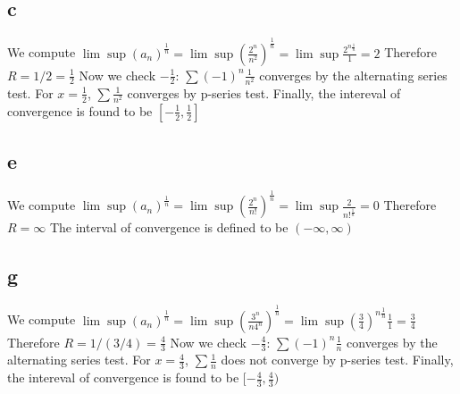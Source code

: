 \documentclass[12pt]{article}
\begin{document}
\subsection{c}
We compute $\lim \sup (a_n)^\frac{1}{n} = \lim \sup (\frac{2^n}{n^2})^\frac{1}{n} = \lim \sup \frac{2^{n\frac{1}{n}}}{1} = 2$
Therefore $R = 1/2 = \frac{1}{2}$
\newline
Now we check $-\frac{1}{2}$: $\sum (-1)^n\frac{1}{n^2}$ converges by the alternating series test.
\newline
For $x= \frac{1}{2}$, $\sum \frac{1}{n^2}$ converges by p-series test.
\newline
Finally, the intereval of convergence is found to be $[-\frac{1}{2},\frac{1}{2}]$

\subsection{e}
We compute $\lim \sup (a_n)^\frac{1}{n} = \lim \sup (\frac{2^n}{n!})^\frac{1}{n} = \lim \sup \frac{2}{n!^{\frac{1}{n}}} = 0$
Therefore $R = \infty$
\newline
The interval of convergence is defined to be $(-\infty, \infty)$

\subsection{g}
We compute $\lim \sup (a_n)^\frac{1}{n} = \lim \sup (\frac{3^n}{n4^n})^\frac{1}{n} = \lim \sup (\frac{3}{4})^{n\frac{1}{n}}\frac{1}{1} = \frac{3}{4}$
Therefore $R = 1/(3/4) = \frac{4}{3}$
\newline
Now we check $-\frac{4}{3}$: $\sum (-1)^n\frac{1}{n}$ converges by the alternating series test.
\newline
For $x= \frac{4}{3}$, $\sum \frac{1}{n}$ does not converge by p-series test.
\newline
Finally, the intereval of convergence is found to be $[-\frac{4}{3},\frac{4}{3})$
\end{document}
